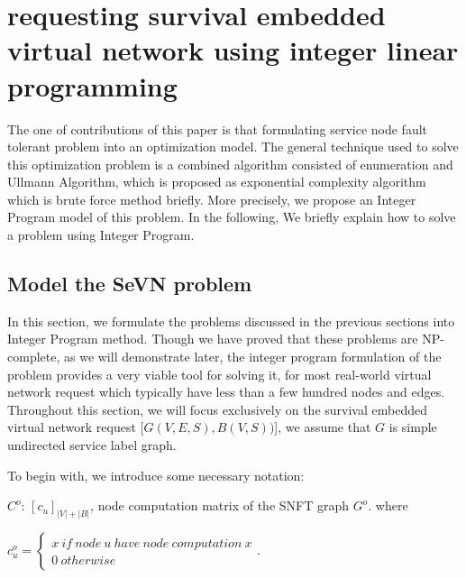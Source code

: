 
\section{requesting survival embedded virtual network using integer linear programming}
\label{sec:SeVN_ILP}
The one of contributions of this paper is that formulating service node fault tolerant problem into an optimization model. The general technique used to solve this optimization problem is a combined algorithm consisted of enumeration and Ullmann Algorithm\cite{ullmann1976algorithm}, which is proposed as  exponential complexity algorithm which is brute force method briefly. More precisely, we propose an Integer Program\cite{schrijver1998theory} model of this problem. In the following, We briefly explain how to solve a problem using Integer Program.

\subsection{Model the SeVN problem}
In this section, we formulate the problems discussed in the previous sections into Integer Program method. Though we have proved that these problems are NP-complete, as we will demonstrate later, the integer program formulation of the problem provides a very viable tool for solving it, for most real-world virtual network request which typically have less than a few hundred nodes and edges. Throughout this section, we will focus exclusively on the survival embedded virtual network request [$G(V,E,S),B(V,S))$], we assume that $G$ is simple undirected service label graph.


To begin with, we introduce some necessary notation:

$C^o$: $[c_{u}]_{|V|+|B|}$, node computation matrix of the SNFT graph $G^o$. where

${c^o_{u}}=\left\{ \begin{array}{l}x\ if\ node\ u\ have\ node\ computation\ x\\
0\ otherwise
\end{array} \right.$.

